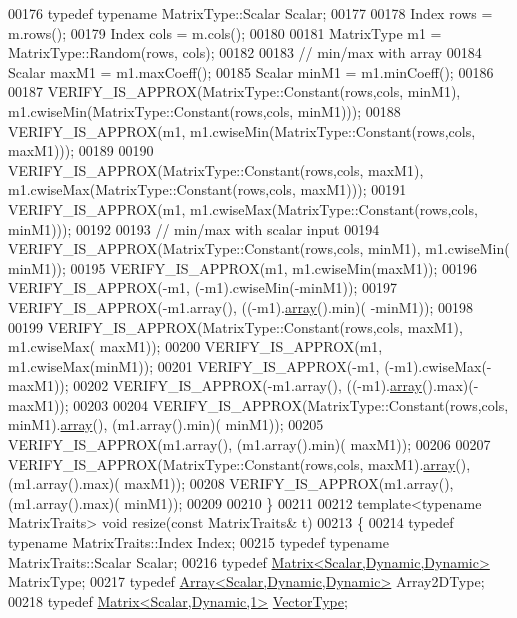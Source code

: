 \begin{DoxyCode}
00176   \textcolor{keyword}{typedef} \textcolor{keyword}{typename} MatrixType::Scalar Scalar;
00177 
00178   Index rows = m.rows();
00179   Index cols = m.cols();
00180 
00181   MatrixType m1 = MatrixType::Random(rows, cols);
00182 
00183   \textcolor{comment}{// min/max with array}
00184   Scalar maxM1 = m1.maxCoeff();
00185   Scalar minM1 = m1.minCoeff();
00186 
00187   VERIFY\_IS\_APPROX(MatrixType::Constant(rows,cols, minM1), m1.cwiseMin(MatrixType::Constant(rows,cols, 
      minM1)));
00188   VERIFY\_IS\_APPROX(m1, m1.cwiseMin(MatrixType::Constant(rows,cols, maxM1)));
00189 
00190   VERIFY\_IS\_APPROX(MatrixType::Constant(rows,cols, maxM1), m1.cwiseMax(MatrixType::Constant(rows,cols, 
      maxM1)));
00191   VERIFY\_IS\_APPROX(m1, m1.cwiseMax(MatrixType::Constant(rows,cols, minM1)));
00192 
00193   \textcolor{comment}{// min/max with scalar input}
00194   VERIFY\_IS\_APPROX(MatrixType::Constant(rows,cols, minM1), m1.cwiseMin( minM1));
00195   VERIFY\_IS\_APPROX(m1, m1.cwiseMin(maxM1));
00196   VERIFY\_IS\_APPROX(-m1, (-m1).cwiseMin(-minM1));
00197   VERIFY\_IS\_APPROX(-m1.array(), ((-m1).\hyperlink{class_eigen_1_1array}{array}().min)( -minM1));
00198 
00199   VERIFY\_IS\_APPROX(MatrixType::Constant(rows,cols, maxM1), m1.cwiseMax( maxM1));
00200   VERIFY\_IS\_APPROX(m1, m1.cwiseMax(minM1));
00201   VERIFY\_IS\_APPROX(-m1, (-m1).cwiseMax(-maxM1));
00202   VERIFY\_IS\_APPROX(-m1.array(), ((-m1).\hyperlink{class_eigen_1_1array}{array}().max)(-maxM1));
00203 
00204   VERIFY\_IS\_APPROX(MatrixType::Constant(rows,cols, minM1).\hyperlink{class_eigen_1_1array}{array}(), (m1.array().min)( minM1));
00205   VERIFY\_IS\_APPROX(m1.array(), (m1.array().min)( maxM1));
00206 
00207   VERIFY\_IS\_APPROX(MatrixType::Constant(rows,cols, maxM1).\hyperlink{class_eigen_1_1array}{array}(), (m1.array().max)( maxM1));
00208   VERIFY\_IS\_APPROX(m1.array(), (m1.array().max)( minM1));
00209 
00210 \}
00211 
00212 \textcolor{keyword}{template}<\textcolor{keyword}{typename} MatrixTraits> \textcolor{keywordtype}{void} resize(\textcolor{keyword}{const} MatrixTraits& t)
00213 \{
00214   \textcolor{keyword}{typedef} \textcolor{keyword}{typename} MatrixTraits::Index Index;
00215   \textcolor{keyword}{typedef} \textcolor{keyword}{typename} MatrixTraits::Scalar Scalar;
00216   \textcolor{keyword}{typedef} \hyperlink{group___core___module}{Matrix<Scalar,Dynamic,Dynamic>} MatrixType;
00217   \textcolor{keyword}{typedef} \hyperlink{group___core___module_class_eigen_1_1_array}{Array<Scalar,Dynamic,Dynamic>} Array2DType;
00218   \textcolor{keyword}{typedef} \hyperlink{group___core___module}{Matrix<Scalar,Dynamic,1>} \hyperlink{struct_vector_type}{VectorType};

\end{DoxyCode}
